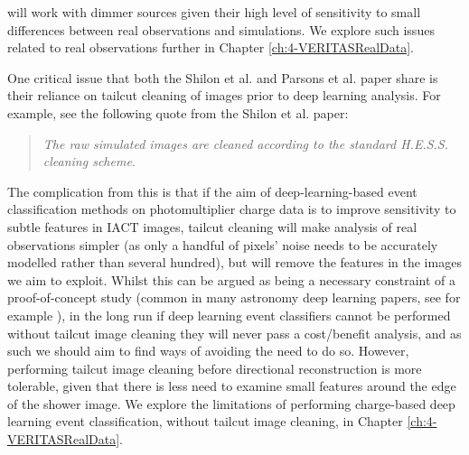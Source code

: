 will work with dimmer sources given their high level of sensitivity to small differences between real observations and simulations. We explore such issues related to real observations further in Chapter \ref{ch:4-VERITASRealData}.

One critical issue that both the Shilon et al. and Parsons et al. paper share is their reliance on tailcut cleaning of images prior to deep learning analysis. For example, see the following quote from the Shilon et al. paper:
\begin{quote}
    \textit{The raw simulated images are cleaned according to the standard H.E.S.S. cleaning scheme.}
\end{quote}

The complication from this is that if the aim of deep-learning-based event classification methods on photomultiplier charge data is to improve sensitivity to subtle features in IACT images, tailcut cleaning will make analysis of real observations simpler (as only a handful of pixels' noise needs to be accurately modelled rather than several hundred), but will remove the features in the images we aim to exploit. Whilst this can be argued as being a necessary constraint of a proof-of-concept study (common in many astronomy deep learning papers, see for example \cite{dodgygal}), in the long run if deep learning event classifiers cannot be performed without tailcut image cleaning they will never pass a cost/benefit analysis, and as such we should aim to find ways of avoiding the need to do so. However, performing tailcut image cleaning before directional reconstruction is more tolerable, given that there is less need to examine small features around the edge of the shower image. We explore the limitations of performing charge-based deep learning event classification, without tailcut image cleaning, in Chapter \ref{ch:4-VERITASRealData}.  

